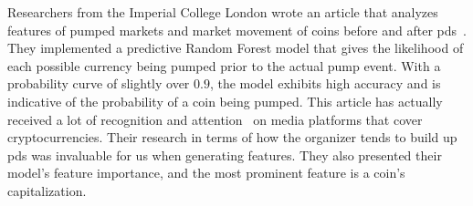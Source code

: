 Researchers from the Imperial College London wrote an article that analyzes features of pumped markets and market movement of coins before and after \acp{pd}~\cite{P&D_anatomy}. They implemented a predictive Random Forest model that gives the likelihood of each possible currency being pumped prior to the actual pump event. With a probability curve of slightly over $0.9$, the model exhibits high accuracy and is indicative of the probability of a coin being pumped. This article has actually received a lot of recognition and attention~\cite{P&D_MIT_crypto, P&D_cointelegraph, P&D_UTB} on media platforms that cover cryptocurrencies. Their research in terms of how the organizer tends to build up \acp{pd} was invaluable for us when generating features. They also presented their model's feature importance, and the most prominent feature is a coin's capitalization.